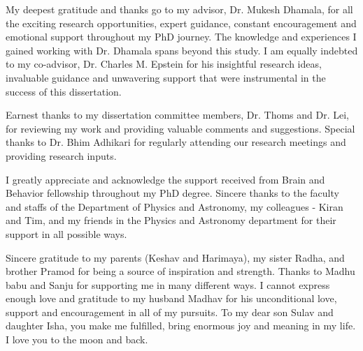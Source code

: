 My deepest gratitude and thanks go to my advisor, Dr. Mukesh Dhamala, for all the exciting research opportunities, expert guidance, constant encouragement and emotional support throughout my PhD journey. The knowledge and experiences I gained working with Dr. Dhamala spans beyond this study. I am equally indebted to my co-advisor, Dr. Charles M. Epstein for his insightful research ideas, invaluable guidance and unwavering support that were instrumental in the success of this dissertation. 

Earnest thanks to my dissertation committee members, Dr. Thoms and Dr. Lei, for reviewing my work and providing valuable comments and suggestions. Special thanks to Dr. Bhim Adhikari for regularly attending our research meetings and providing research inputs. 

I greatly appreciate and acknowledge the support received from Brain and Behavior fellowship throughout my PhD degree. Sincere thanks to the faculty and staffs of the Department of Physics and Astronomy, my colleagues - Kiran and Tim, and my friends in the Physics and Astronomy department for their support in all possible ways.

Sincere gratitude to my parents (Keshav and Harimaya), my sister Radha, and brother Pramod for being a source of inspiration and strength. Thanks to Madhu babu and Sanju for supporting me in many different ways. I cannot express enough love and gratitude to my husband Madhav for his unconditional love, support and encouragement in all of my pursuits. To my dear son Sulav and daughter Isha, you make me fulfilled, bring enormous joy and meaning in my life. I love you to the moon and back.

